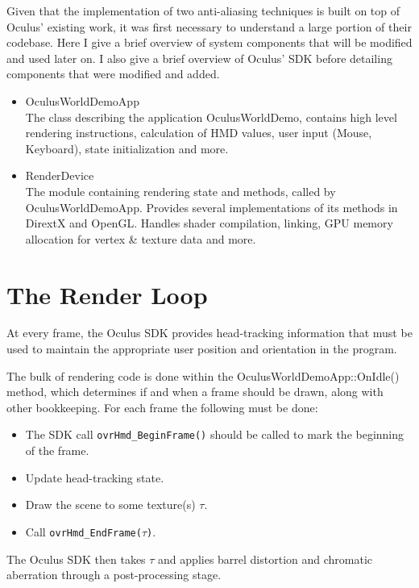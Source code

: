 \documentclass[12pt,a4paper,twoside,openright]{report}
\begin{document}
Given that the implementation of two anti-aliasing techniques is built on top of Oculus' existing work, it was first necessary to understand a large portion of their codebase.
Here I give a brief overview of system components that will be modified and used later on. I also give a brief overview of Oculus' SDK before detailing components that were modified and added.

\begin{itemize}
\item OculusWorldDemoApp \\
  The class describing the application OculusWorldDemo, contains high level rendering instructions, calculation of HMD values, user input (Mouse, Keyboard), state initialization and more.

\item RenderDevice \\
  The module containing rendering state and methods, called by OculusWorldDemoApp. Provides several implementations of its methods in DirextX and OpenGL. Handles shader compilation, linking, GPU memory allocation for vertex \& texture data and more.

\end{itemize}

\section{The Render Loop}
At every frame, the Oculus SDK provides head-tracking information that must be used to maintain the appropriate user position and orientation in the program.

\noindent The bulk of rendering code is done within the OculusWorldDemoApp::OnIdle() method, which determines if and when a frame should be drawn, along with other bookkeeping.
For each frame the following must be done:

\begin{itemize}
  \item The SDK call \texttt{ovrHmd\_BeginFrame()} should be called to mark the beginning of the frame.
  \item Update head-tracking state.
  \item Draw the scene to some texture(s) $\tau$.
  \item Call \texttt{ovrHmd\_EndFrame($\tau$)}.
\end{itemize}

\noindent The Oculus SDK then takes $\tau$ and applies barrel distortion and chromatic aberration through a post-processing stage. 
\end{document}
